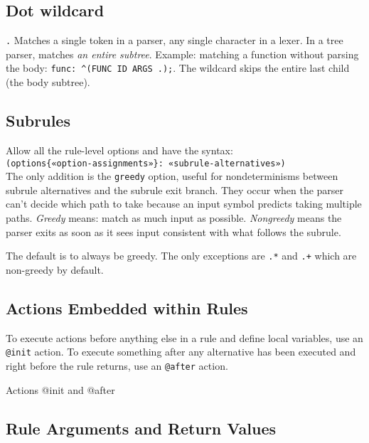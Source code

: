 \subsection{Dot wildcard}

\verb=.= Matches a single token in a parser, any single character in a lexer.
In a tree parser, matches \emph{an entire subtree}.
Example: matching a function without parsing the body:
\verb|func: ^(FUNC ID ARGS .);|.
The wildcard skips the entire last child (the body subtree).


\subsection{Subrules}

Allow all the rule-level options and have the syntax:\\
\verb|(options{«option-assignments»}: «subrule-alternatives»)|\\
The only addition is the \verb=greedy= option, useful for nondeterminisms
between subrule alternatives and the subrule exit branch.
They occur when the parser can't decide which path to take
because an input symbol predicts taking multiple paths.
\emph{Greedy} means: match as much input as possible.
\emph{Nongreedy} means the parser exits
as soon as it sees input consistent with what follows the subrule.

The default is to always be greedy.
The only exceptions are \verb|.*| and \verb|.+|
which are non-greedy by default.


\subsection{Actions Embedded within Rules}

To execute actions before anything else in a rule and define local variables,
use an \verb=@init= action.
To execute something after any alternative has been executed
and right before the rule returns,
use an \verb=@after= action.

\begin{program}
\caption{Actions @init and @after\label{gram:action-init-after}}
\end{program}


\subsection{Rule Arguments and Return Values}

